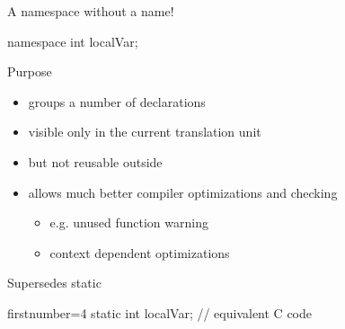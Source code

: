 \begin{advanced}
\begin{frame}[fragile]
  \begin{exampleblock}{A namespace without a name!}
    \begin{cppcode*}{}
      namespace {
        int localVar;
      }
    \end{cppcode*}
  \end{exampleblock}
  \begin{block}{Purpose}
    \begin{itemize}
    \item groups a number of declarations
    \item visible only in the current translation unit
    \item but not reusable outside
    \item allows much better compiler optimizations and checking
      \begin{itemize}
      \item e.g. unused function warning
      \item context dependent optimizations
      \end{itemize}
    \end{itemize}
  \end{block}
  \begin{alertblock}{Supersedes static}
    \begin{cppcode*}{firstnumber=4}
      static int localVar; // equivalent C code
    \end{cppcode*}
  \end{alertblock}
\end{frame}


\end{advanced}
